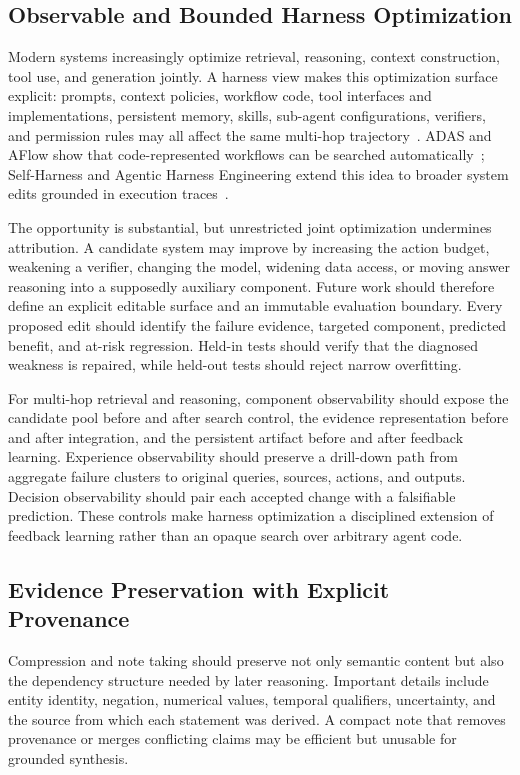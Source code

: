 \subsection{Observable and Bounded Harness Optimization}
Modern systems increasingly optimize retrieval, reasoning, context construction, tool use, and generation jointly. A harness view makes this optimization surface explicit: prompts, context policies, workflow code, tool interfaces and implementations, persistent memory, skills, sub-agent configurations, verifiers, and permission rules may all affect the same multi-hop trajectory~\cite{weng2026harness}. ADAS and AFlow show that code-represented workflows can be searched automatically~\cite{hu2025adas,zhang2025aflow}; Self-Harness and Agentic Harness Engineering extend this idea to broader system edits grounded in execution traces~\cite{zhang2026selfharness,lin2026ahe}.

The opportunity is substantial, but unrestricted joint optimization undermines attribution. A candidate system may improve by increasing the action budget, weakening a verifier, changing the model, widening data access, or moving answer reasoning into a supposedly auxiliary component. Future work should therefore define an explicit editable surface and an immutable evaluation boundary. Every proposed edit should identify the failure evidence, targeted component, predicted benefit, and at-risk regression. Held-in tests should verify that the diagnosed weakness is repaired, while held-out tests should reject narrow overfitting.

For multi-hop retrieval and reasoning, component observability should expose the candidate pool before and after search control, the evidence representation before and after integration, and the persistent artifact before and after feedback learning. Experience observability should preserve a drill-down path from aggregate failure clusters to original queries, sources, actions, and outputs. Decision observability should pair each accepted change with a falsifiable prediction. These controls make harness optimization a disciplined extension of feedback learning rather than an opaque search over arbitrary agent code.

\subsection{Evidence Preservation with Explicit Provenance}
Compression and note taking should preserve not only semantic content but also the dependency structure needed by later reasoning. Important details include entity identity, negation, numerical values, temporal qualifiers, uncertainty, and the source from which each statement was derived. A compact note that removes provenance or merges conflicting claims may be efficient but unusable for grounded synthesis.

